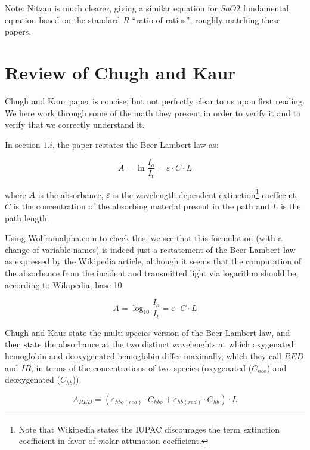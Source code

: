 \documentclass[11pt]{article}
\begin{document}
Note: Nitzan\cite{nitzan2014pulse} is much clearer, giving a similar equation for $SaO2$ 
fundamental equation based on the standard $R$ ``ratio of ratios'', roughly matching these papers.


\section{Review of Chugh and Kaur}

Chugh and Kaur\cite{ChughAndKaur2015} paper is concise, but not perfectly clear to us upon first reading. We here work through some of the
math they present in order to verify it and to verify that we correctly understand it.

In section $1.i$, the paper restates the Beer-Lambert law\cite{wiki:Beer-Lambert} as:

\begin{equation}
  A = \ln \frac{I_o}{I_t} = \varepsilon \cdot C \cdot L
  \end{equation}

where $A$ is the absorbance, $\varepsilon$ is the wavelength-dependent extinction\footnote{Note that Wikipedia\cite{wiki:MolarAttenuation} states the IUPAC discourages the
term {\emph extinction coefficient} in favor of {\emph molar attunation coefficient}.}
coeffecint, $C$ is the concentration of the absorbing material present in the
path and $L$ is the path length.


Using Wolframalpha.com to check this, we see that this formulation
(with a change of variable names)
is indeed just a restatement of the Beer-Lambert law as expressed by the
Wikipedia article\cite{wiki:Beer-Lambert}, although it seems that the computation
of the absorbance from the incident and transmitted light via 
logarithm should be, according to Wikipedia, base 10:

\begin{equation}
  A = \log_{10} \frac{I_o}{I_t} = \varepsilon \cdot C \cdot L
\end{equation}


Chugh and Kaur state the multi-species version of the Beer-Lambert law,
and then state the absorbance at the two distinct wavelenghts at which
oxygenated hemoglobin and deoxygenated hemoglobin differ maximally,
which they call $RED$ and $IR$, in terms of the concentrations of
two species (oxygenated ($C_{hbo}$) and
deoxygenated  ($C_{hb}$)).

\begin{equation}
  A_{RED} = (\varepsilon_{hbo(red)}\cdot C_{hbo} + \varepsilon_{hb(red)}\cdot C_{hb}) \cdot L
\end{equation}
\end{document}
